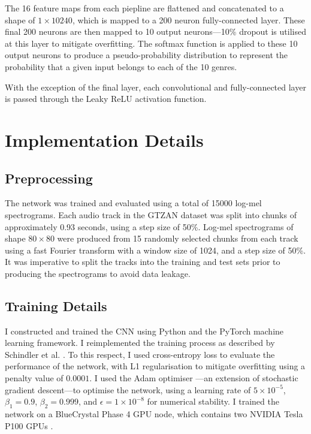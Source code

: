 \documentclass[conference]{IEEEtran}
\begin{document}
The 16 feature maps from each piepline are flattened and concatenated to a shape of $1\times10240$, which is mapped to a 200 neuron fully-connected layer.
These final 200 neurons are then mapped to 10 output neurons---10\% dropout is utilised at this layer to mitigate overfitting.
The softmax function is applied to these 10 output neurons to produce a pseudo-probability distribution to represent the probability that a given input belongs to each of the 10 genres.

With the exception of the final layer, each convolutional and fully-connected layer is passed through the Leaky ReLU activation function.

\section{Implementation Details}

\subsection{Preprocessing}

The network was trained and evaluated using a total of 15000 log-mel spectrograms.
Each audio track in the GTZAN dataset was split into chunks of approximately 0.93 seconds, using a step size of 50\%.
Log-mel spectrograms of shape $80\times80$ were produced from 15 randomly selected chunks from each track using a fast Fourier transform with a window size of 1024, and a step size of 50\%.
It was imperative to split the tracks into the training and test sets prior to producing the spectrograms to avoid data leakage.

\subsection{Training Details}

I constructed and trained the CNN using Python and the PyTorch \cite{PyTorch} machine learning framework.
I reimplemented the training process as described by Schindler et al. \cite{SchindlerLidyRauber}.
To this respect, I used cross-entropy loss to evaluate the performance of the network, with L1 regularisation to mitigate overfitting using a penalty value of $0.0001$.
I used the Adam optimiser \cite{KingmaBa}---an extension of stochastic gradient descent---to optimise the network, using a learning rate of $5\times10^{-5}$, $\beta_1=0.9$, $\beta_2=0.999$, and $\epsilon=1\times10^{-8}$ for numerical stability.
I trained the network on a BlueCrystal Phase 4 GPU node, which contains two NVIDIA Tesla P100 GPUs \cite{bc4}.
\end{document}
